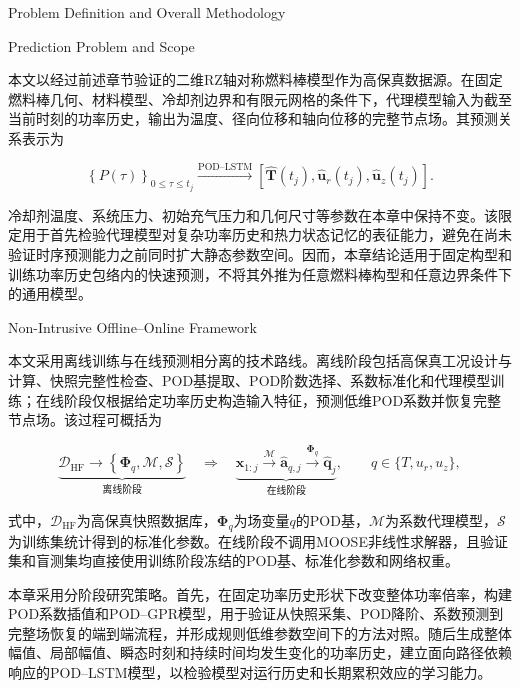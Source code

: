 {Problem Definition and Overall Methodology}

{Prediction Problem and Scope}

本文以经过前述章节验证的二维RZ轴对称燃料棒模型作为高保真数据源。在固定燃料棒几何、材料模型、冷却剂边界和有限元网格的条件下，代理模型输入为截至当前时刻的功率历史，输出为温度、径向位移和轴向位移的完整节点场。其预测关系表示为

\begin{equation}
	\left\{P(\tau)\right\}_{0\leq\tau\leq t_j}
	\xrightarrow{\mathrm{POD\text{--}LSTM}}
	\left[
	\widehat{\boldsymbol T}(t_j),
	\widehat{\boldsymbol u}_r(t_j),
	\widehat{\boldsymbol u}_z(t_j)
	\right].
	\label{eq:ch6_final_mapping}
\end{equation}

冷却剂温度、系统压力、初始充气压力和几何尺寸等参数在本章中保持不变。该限定用于首先检验代理模型对复杂功率历史和热力状态记忆的表征能力，避免在尚未验证时序预测能力之前同时扩大静态参数空间。因而，本章结论适用于固定构型和训练功率历史包络内的快速预测，不将其外推为任意燃料棒构型和任意边界条件下的通用模型。

{Non-Intrusive Offline--Online Framework}

本文采用离线训练与在线预测相分离的技术路线。离线阶段包括高保真工况设计与计算、快照完整性检查、POD基提取、POD阶数选择、系数标准化和代理模型训练；在线阶段仅根据给定功率历史构造输入特征，预测低维POD系数并恢复完整节点场。该过程可概括为

\begin{equation}
	\underbrace{\mathcal D_{\mathrm{HF}}\rightarrow
		\left\{\boldsymbol\Phi_q,\mathcal M,\mathcal S\right\}}
	_{\text{离线阶段}}
	\quad\Longrightarrow\quad
	\underbrace{\boldsymbol x_{1:j}\xrightarrow{\mathcal M}
		\widehat{\boldsymbol a}_{q,j}
		\xrightarrow{\boldsymbol\Phi_q}
		\widehat{\boldsymbol q}_j}_{\text{在线阶段}},
	\qquad q\in\{T,u_r,u_z\},
	\label{eq:ch6_offline_online_framework}
\end{equation}

式中，$\mathcal D_{\mathrm{HF}}$为高保真快照数据库，$\boldsymbol\Phi_q$为场变量$q$的POD基，$\mathcal M$为系数代理模型，$\mathcal S$为训练集统计得到的标准化参数。在线阶段不调用MOOSE非线性求解器，且验证集和盲测集均直接使用训练阶段冻结的POD基、标准化参数和网络权重。

本章采用分阶段研究策略。首先，在固定功率历史形状下改变整体功率倍率，构建POD系数插值和POD--GPR模型，用于验证从快照采集、POD降阶、系数预测到完整场恢复的端到端流程，并形成规则低维参数空间下的方法对照。随后生成整体幅值、局部幅值、瞬态时刻和持续时间均发生变化的功率历史，建立面向路径依赖响应的POD--LSTM模型，以检验模型对运行历史和长期累积效应的学习能力。

